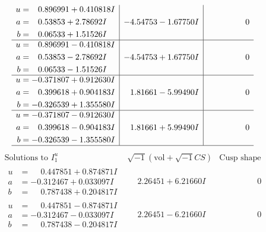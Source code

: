\documentclass[1p]{elsarticle_modified}
\theoremstyle{definition}
\newcommand{\I}{\sqrt{-1}}
\begin{document}
$$\begin{array}{c|c|c}
\begin{aligned}
u &= \phantom{-}0.896991 + 0.410818 I \\
a &= \phantom{-}0.53853 + 2.78692 I \\
b &= \phantom{-}0.06533 + 1.51526 I\end{aligned}
 & -4.54753 - 1.67750 I & \phantom{-0.000000 } 0 \\ \hline\begin{aligned}
u &= \phantom{-}0.896991 - 0.410818 I \\
a &= \phantom{-}0.53853 - 2.78692 I \\
b &= \phantom{-}0.06533 - 1.51526 I\end{aligned}
 & -4.54753 + 1.67750 I & \phantom{-0.000000 } 0 \\ \hline\begin{aligned}
u &= -0.371807 + 0.912630 I \\
a &= \phantom{-}0.399618 + 0.904183 I \\
b &= -0.326539 + 1.355580 I\end{aligned}
 & \phantom{-}1.81661 - 5.99490 I & \phantom{-0.000000 } 0 \\ \hline\begin{aligned}
u &= -0.371807 - 0.912630 I \\
a &= \phantom{-}0.399618 - 0.904183 I \\
b &= -0.326539 - 1.355580 I\end{aligned}
 & \phantom{-}1.81661 + 5.99490 I & \phantom{-0.000000 } 0\\
 \hline 
 \end{array}$$\newpage$$\begin{array}{c|c|c}  
\text{Solutions to }I^u_{1}& \I (\text{vol} + \sqrt{-1}CS) & \text{Cusp shape}\\
 \hline 
\begin{aligned}
u &= \phantom{-}0.447851 + 0.874871 I \\
a &= -0.312467 + 0.033097 I \\
b &= \phantom{-}0.787438 + 0.204817 I\end{aligned}
 & \phantom{-}2.26451 + 6.21660 I & \phantom{-0.000000 } 0 \\ \hline\begin{aligned}
u &= \phantom{-}0.447851 - 0.874871 I \\
a &= -0.312467 - 0.033097 I \\
b &= \phantom{-}0.787438 - 0.204817 I\end{aligned}
 & \phantom{-}2.26451 - 6.21660 I & \phantom{-0.000000 } 0 \\ \hline\begin{aligned}

\end{aligned}
\end{array}$$
\end{document}

